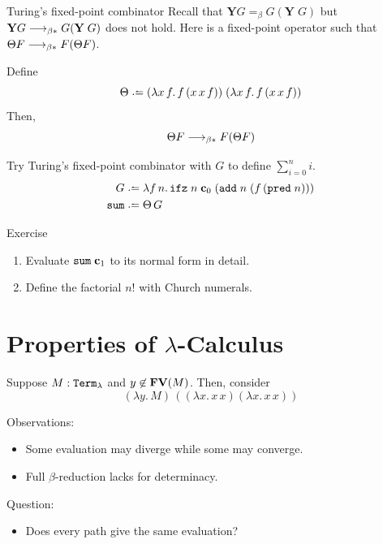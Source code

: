 \begin{frame}{Turing's fixed-point combinator}
  Recall that $\mathbf{Y}G =_\beta G(\mathbf{Y}\;G)$ but $\mathbf{Y}G \longrightarrow_{\beta*}
  G(\mathbf{Y}\;G)$ does not hold.  Here is a fixed-point operator such that
  $\Theta F \longrightarrow_{\beta*} F(\Theta F)$.
\begin{proposition}
  Define 
  \[
    \Theta \defeq 
    (\lambda x\,f.\,f\,(x\,x\,f))\;
    (\lambda x\,f.\,f\,(x\,x\,f))
  \]
  Then, 
  \[
    \Theta F \longrightarrow_{\beta*} F (\Theta F)
  \]
\end{proposition}
Try Turing's fixed-point combinator with $G$ to define $\sum_{i=0}^n i$.
\begin{align*}
  G \defeq{} &
  \lambda f\,n.\,
  \mathtt{ifz}\;n\;\bc_0\;
  (\add\;n\;(f\,(\mathtt{pred}\;n))) \\
  \mathtt{sum} \defeq\; & \Theta\,G 
\end{align*}
\end{frame}

\begin{frame}{Exercise}
  \begin{enumerate}
    \item Evaluate $\mathtt{sum}\;\mathbf{c}_1$ to its normal form in detail.
    \item Define the factorial $n!$ with Church numerals.
  \end{enumerate}
\end{frame}


\section{Properties of $\lambda$-Calculus}

\begin{frame}
  \begin{example}
    Suppose $M : \mathtt{Term}_\lambda$ and $y \not\in \mathbf{FV}(M)$. 
    Then, consider 
    \[
      (\lambda y.\, M)\, ((\lambda x.\, x\,x)(\lambda x.\, x\, x))
    \]
  \end{example}
  Observations:
  \begin{itemize}
    \item Some evaluation may diverge while some may converge.
    \item Full $\beta$-reduction lacks for determinacy. 
  \end{itemize}
  Question:
  \begin{itemize}
    \item Does every path give the same evaluation?
  \end{itemize}
\end{frame}

